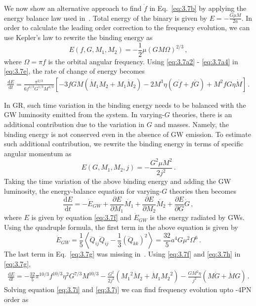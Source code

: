 \documentclass[11pt]{article}
\begin{document}
  \hspace{15.5pt} We now show an alternative approach to find $\dot f$ in Eq.~\eqref{eq:3.7b} by applying the energy balance law used in~\cite{Yunes:2009bv}. Total energy of the binary is given by $E=-\frac{G\mu M}{2a}$. In order to calculate the leading order correction to the frequency evolution, we can use Kepler's law to rewrite the binding energy as 
 \begin{equation}\label{eq:3.7e}
 E(f,G,M_1,M_2)=-\frac{1}{2}\mu (GM\Omega)^{2/3}\,,
 \end{equation}
 where $\Omega=\pi f$ is the orbital angular frequency. Using \eqref{eq:3.7a2} - \eqref{eq:3.7a4} in  \eqref{eq:3.7e}, the rate of change of energy becomes
 \begin{align}\label{eq:3.7j}
 \frac{\mathrm{d} E}{\mathrm{d} t}=\frac{\pi^{2/3}}{6f^{1/3}G^{1/3}M^{4/3}}\left[-3fGM(\dot{M}_1M_2+M_1\dot{M}_2)-2M^3\eta(G\dot{f}+f\dot{G})+M^2fG\eta\dot{M}\right]\,.
 \end{align}
 
In GR, such time variation in the binding energy needs to be balanced with the GW luminosity emitted from the system. In varying-$G$ theories, there is an additional contribution due to the variation in $G$ and masses. Namely, the binding energy is not conserved even in the absence of GW emission. To estimate such additional contribution, we rewrite the binding energy in terms of specific angular momentum as
 \begin{equation}\label{eq:3.7f}
 E(G,M_1,M_2,j)=-\frac{G^2 \mu  M^2}{2 j^2}\,.
 \end{equation}
 \hspace*{15.5pt} Taking the time variation of the above binding energy and adding the GW luminosity, the energy-balance equation for varying-$G$ theories then becomes
 \begin{equation}\label{eq:3.7g}
\frac{\mathrm{d} E}{\mathrm{d} t}=-\dot{E}_{GW}+\frac{\partial E}{\partial M_1}\dot{M_1}+\frac{\partial E}{\partial M_2}\dot{M_2}+\frac{\partial E}{\partial G}\dot{G}\,,
 \end{equation}
 where $E$ is given by equation \eqref{eq:3.7f} and $\dot{E}_{GW}$ is the energy radiated by GWs. Using the quadruple formula, the first term in the above equation is given by
 \begin{equation}\label{eq:3.7h}
 \dot{E}_{GW}=\frac{1}{5}\left \langle\dddot{Q}_{ij}\dddot{Q}_{ij}-\frac{1}{3}(\dddot{Q}_{kk})^2\right \rangle=\frac{32}{5} a^4 G \mu ^2 \Omega ^6\,.
 \end{equation}
 The last term in Eq.~\eqref{eq:3.7g} was missing in~\cite{Yunes:2009bv}.
 Using \eqref{eq:3.7f} and \eqref{eq:3.7h} in \eqref{eq:3.7g},
 \begin{align}\label{eq:3.7i}
\frac{\mathrm{d} E}{\mathrm{d} t}=- \frac{32}{5} \pi ^{10/3} f^{10/3} \eta ^2 G^{7/3} M^{10/3}-\frac{G^2}{2j^2}({M_1}^2\dot{M}_2+\dot{M}_1{M_2}^2)-\frac{GM^2\eta}{j^2}(M\dot{G}+\dot{M}G)\,.
 \end{align}
 \hspace{15.5pt}Solving equation \eqref{eq:3.7i} and \eqref{eq:3.7j} we can find frequency evolution upto -4PN order as
 
\end{document}
